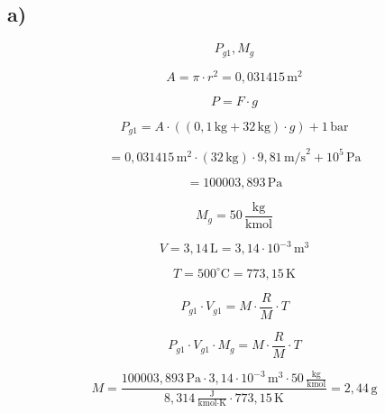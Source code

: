 

\subsection*{a)}

\[
P_{g1}, M_g
\]

\[
A = \pi \cdot r^2 = 0{,}031415 \, \text{m}^2
\]

\[
P = F \cdot g
\]

\[
P_{g1} = A \cdot \left( (0{,}1 \, \text{kg} + 32 \, \text{kg}) \cdot g \right) + 1 \, \text{bar}
\]

\[
= 0{,}031415 \, \text{m}^2 \cdot (32 \, \text{kg}) \cdot 9{,}81 \, \text{m/s}^2 + 10^5 \, \text{Pa}
\]

\[
= 100003{,}893 \, \text{Pa}
\]

\[
M_g = 50 \, \frac{\text{kg}}{\text{kmol}}
\]

\[
V = 3{,}14 \, \text{L} = 3{,}14 \cdot 10^{-3} \, \text{m}^3
\]

\[
T = 500^\circ \text{C} = 773{,}15 \, \text{K}
\]

\[
P_{g1} \cdot V_{g1} = M \cdot \frac{R}{M} \cdot T
\]

\[
P_{g1} \cdot V_{g1} \cdot M_g = M \cdot \frac{R}{M} \cdot T
\]

\[
M = \frac{100003{,}893 \, \text{Pa} \cdot 3{,}14 \cdot 10^{-3} \, \text{m}^3 \cdot 50 \, \frac{\text{kg}}{\text{kmol}}}{8{,}314 \, \frac{\text{J}}{\text{kmol} \cdot \text{K}} \cdot 773{,}15 \, \text{K}} = 2{,}44 \, \text{g}
\]